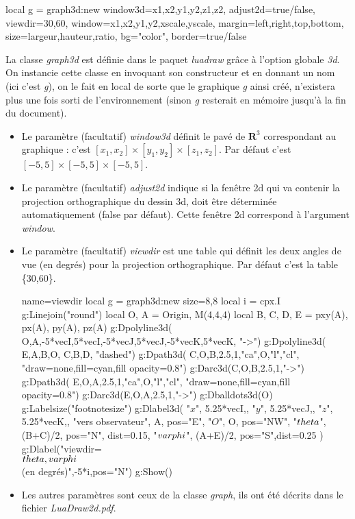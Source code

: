 \documentclass[%
10pt,%
a4paper,%
french,%
]%
{article}%
\begin{document}
\begin{Luacode}
local g = graph3d:new{ window3d={x1,x2,y1,y2,z1,z2}, adjust2d=true/false, viewdir={30,60}, window={x1,x2,y1,y2,xscale,yscale}, margin={left,right,top,bottom}, size={largeur,hauteur,ratio}, bg="color", border=true/false }
\end{Luacode}

La classe \emph{graph3d} est définie dans le paquet \emph{luadraw} grâce à l'option globale \emph{3d}. On instancie cette classe en invoquant son constructeur et en donnant un nom (ici c'est \emph{g}), on le fait en local de sorte que le graphique \emph{g} ainsi créé, n'existera plus une fois sorti de l'environnement (sinon \emph{g} resterait en mémoire jusqu'à la fin du document).

\begin{itemize}
 \item Le paramètre (facultatif) \emph{window3d} définit le pavé de $\mathbf R^3$ correspondant au graphique : c'est $[x_1,x_2]\times[y_1,y_2]\times[z_1,z_2]$. Par défaut c'est $[-5,5]\times[-5,5]\times[-5,5]$.
 \item Le paramètre (facultatif) \emph{adjust2d} indique si la fenêtre 2d qui va contenir la projection orthographique du dessin 3d, doit être déterminée automatiquement (false par défaut). Cette fenêtre 2d correspond à l'argument \emph{window}.
 
 \item Le paramètre (facultatif) \emph{viewdir} est une table qui définit les deux angles de vue (en degrés) pour la projection orthographique. Par défaut c'est la table \{30,60\}.
 
\begin{center}
\label{viewdir}
\begin{luadraw}{name=viewdir}
local g = graph3d:new{ size={8,8} }
local i = cpx.I
g:Linejoin("round")
local O, A = Origin, M(4,4,4)
local B, C, D, E = pxy(A), px(A), py(A), pz(A)
g:Dpolyline3d( {{O,A},{-5*vecI,5*vecI},{-5*vecJ,5*vecJ},{-5*vecK,5*vecK}}, "->")
g:Dpolyline3d( {{E,A,B,O}, {C,B,D}}, "dashed")
g:Dpath3d( {C,O,B,2.5,1,"ca",O,"l","cl"}, "draw=none,fill=cyan,fill opacity=0.8")
g:Darc3d(C,O,B,2.5,1,"->")
g:Dpath3d( {E,O,A,2.5,1,"ca",O,"l","cl"}, "draw=none,fill=cyan,fill opacity=0.8")
g:Darc3d(E,O,A,2.5,1,"->")
g:Dballdots3d(O)
g:Labelsize("footnotesize")
g:Dlabel3d(
    "$x$", 5.25*vecI,{}, "$y$", 5.25*vecJ,{}, "$z$", 5.25*vecK,{},
    "vers observateur", A, {pos="E"},
    "$O$", O, {pos="NW"},
    "$\\theta$", (B+C)/2, {pos="N", dist=0.15},
    "$\\varphi$", (A+E)/2, {pos="S",dist=0.25}
)
g:Dlabel("viewdir=\\{$\\theta,\\varphi$\\} (en degrés)",-5*i,{pos="N"})
g:Show()            
\end{luadraw}
\end{center}

\item Les autres paramètres sont ceux de la classe \emph{graph}, ils ont été décrits dans le fichier \emph{LuaDraw2d.pdf}.
\end{itemize}
\end{document}
